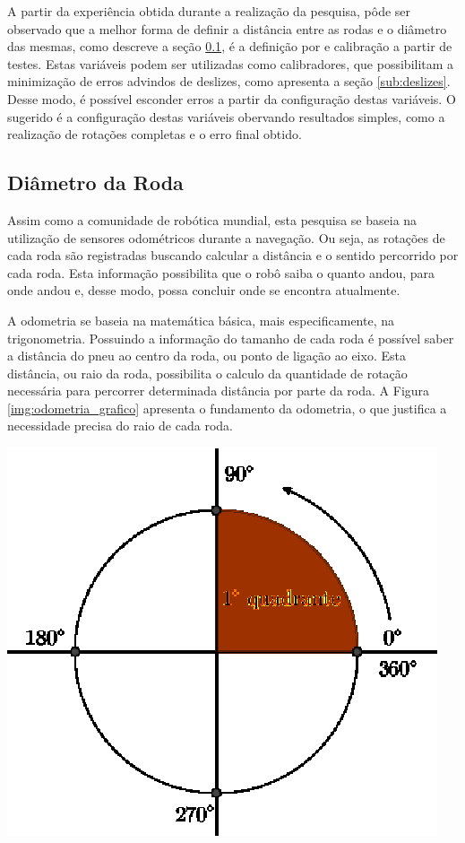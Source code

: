  A partir da experiência obtida durante a realização da pesquisa, pôde ser observado que a melhor forma de definir a distância entre as rodas
 e o diâmetro das mesmas, como descreve a seção \ref{sub:diametro}, é a definição por e calibração a partir de testes. Estas variáveis podem
 ser utilizadas como calibradores, que possibilitam a minimização de erros advindos de deslizes, como apresenta a seção \ref{sub:deslizes}.
 Desse modo, é possível esconder erros a partir da configuração destas variáveis. O sugerido é a configuração destas variáveis obervando
 resultados simples, como a realização de rotações completas e o erro final obtido.

\subsection{Diâmetro da Roda}
\label{sub:diametro}

  Assim como a comunidade de robótica mundial, esta pesquisa se baseia na utilização de sensores odométricos durante a navegação. Ou seja,
  as rotações de cada roda são registradas buscando calcular a distância e o sentido percorrido por cada roda. Esta informação possibilita
  que o robô saiba o quanto andou, para onde andou e, desse modo, possa concluir onde se encontra atualmente.

  A odometria se baseia na matemática básica, mais especificamente, na trigonometria. Possuindo a informação do tamanho de cada roda
  é possível saber a distância do pneu ao centro da roda, ou ponto de ligação ao eixo. Esta distância, ou raio da roda, possibilita o
   calculo da quantidade de rotação necessária para percorrer determinada distância por parte da roda. A Figura \ref{img:odometria_grafico}
   apresenta o fundamento da odometria, o que justifica a necessidade precisa do raio de cada roda.

   {\centering
   \includegraphics[scale=1]{figuras/odometria_grafico.eps}
   \label{img:odometria_grafico}
   \par}

